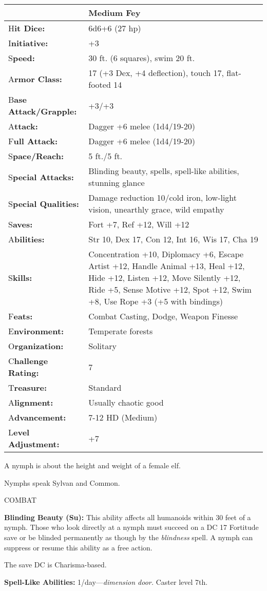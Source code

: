 \documentclass{article}
\begin{document}
\begin{tabular}{|>{\raggedright}p{89pt}|>{\raggedright}p{237pt}|}
\hline
  & Medium Fey\tabularnewline
\hline
H\textbf{it Dice:} & 6d6+6 (27 hp)\tabularnewline
\hline
I\textbf{nitiative:} & +3\tabularnewline
\hline
S\textbf{peed:} & 30 ft. (6 squares), swim 20 ft.\tabularnewline
\hline
A\textbf{rmor Class:} & 17 (+3 Dex, +4 deflection), touch 17, flat-footed 14\tabularnewline
\hline
B\textbf{ase Attack/Grapple:} & +3/+3\tabularnewline
\hline
A\textbf{ttack:} & Dagger +6 melee (1d4/19-20)\tabularnewline
\hline
F\textbf{ull Attack:} & Dagger +6 melee (1d4/19-20)\tabularnewline
\hline
S\textbf{pace/Reach:} & 5 ft./5 ft.\tabularnewline
\hline
S\textbf{pecial Attacks:} & Blinding beauty, spells, spell-like abilities, stunning 
glance\tabularnewline
\hline
S\textbf{pecial Qualities:} & Damage reduction 10/cold iron, low-light vision, 
unearthly grace, wild empathy\tabularnewline
\hline
S\textbf{aves:} & Fort +7, Ref +12, Will +12\tabularnewline
\hline
A\textbf{bilities:} & Str 10, Dex 17, Con 12, Int 16, Wis 17, Cha 19\tabularnewline
\hline
S\textbf{kills:} & Concentration +10, Diplomacy +6, Escape Artist +12, Handle Animal 
+13, Heal +12, Hide +12, Listen +12, Move Silently +12, Ride +5, Sense Motive +12, 
Spot +12, Swim +8, Use Rope +3 (+5 with bindings)\tabularnewline
\hline
F\textbf{eats:} & Combat Casting, Dodge, Weapon Finesse \tabularnewline
\hline
E\textbf{nvironment:} & Temperate forests\tabularnewline
\hline
O\textbf{rganization:} & Solitary\tabularnewline
\hline
C\textbf{hallenge Rating:} & 7\tabularnewline
\hline
T\textbf{reasure:} & Standard\tabularnewline
\hline
A\textbf{lignment:} & Usually chaotic good\tabularnewline
\hline
A\textbf{dvancement:} & 7-12 HD (Medium)\tabularnewline
\hline
L\textbf{evel Adjustment:} & +7\tabularnewline
\hline
\end{tabular}

A nymph is about the height and weight of a female elf.

Nymphs speak Sylvan and Common.

COMBAT

\textbf{Blinding Beauty (Su): }This ability affects all humanoids within 30 feet 
of a nymph. Those who look directly at a nymph must succeed on a DC 17 Fortitude 
save or be blinded permanently as though by the \textit{blindness }spell. A nymph 
can suppress or resume this ability as a free action.

The save DC is Charisma-based.

\textbf{Spell-Like Abilities:} 1/day---\textit{dimension door. }Caster level 7th.
\end{document}
